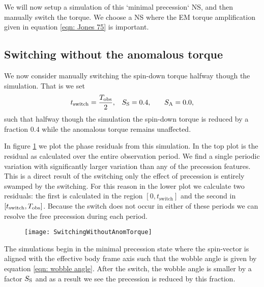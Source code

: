 \documentclass[../full_thesis/full_thesis.tex]{subfiles}
\newcommand{\thisdir}{../inertial_frame}
\begin{document}
\begin{figure}[htb]
\begin{floatrow}
\capbtabbox{%
  
}{%
  \caption{}%
  \label{tab: NoSwitching properties}
}
\end{floatrow}
\end{figure}


We will now setup a simulation of this `minimal precession` NS, and then 
manually switch the torque. We choose a NS where the EM torque amplification
given in equation \eqref{eqn: Jones 75} is important.

\subsection{Switching without the anomalous torque}
We now consider manually switching the spin-down torque halfway though the simulation.
That is we set
\begin{align}
    t_{\mathrm{switch}} = \frac{T_{\textrm{obs}}}{2}, &&& S_{\mathrm{S}} = 0.4, &&& S_{\mathrm{A}} = 0.0,
\end{align}
such that halfway though the simulation the spin-down torque is reduced by a
fraction $0.4$ while the anomalous torque remains unaffected. 

In figure \ref{fig: switching without anom} we plot the phase residuals from
this simulation. In the top plot is the residual as calculated over the entire
observation period. We find a single periodic variation with significantly
larger variation than any of the precession features. This is a direct result
of the switching only%
the
effect of precession is entirely swamped by the switching. For this reason in
the lower plot we calculate two residuals: the first is calculated
in the region $[0, t_{\mathrm{switch}}]$ and the second in $[t_{\mathrm{switch}}, T_{\textrm{obs}}]$.
Because the switch does not occur in either of these periods we can resolve the
free precession during each period.

\begin{figure}[htb]
\texttt{[image: SwitchingWithoutAnomTorque]}
\caption{}
\label{fig: switching without anom}
\end{figure}

The simulations begin in the minimal precession state where the spin-vector
is aligned with the effective body frame axis such that the wobble angle is given
by equation \eqref{eqn: wobble angle}. After the switch, the wobble
angle is smaller by a factor $S_{\mathrm{S}}$ and as a result we see the precession is
reduced by this fraction.
\end{document}
